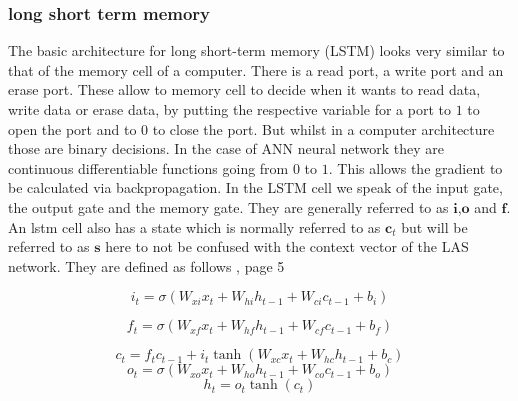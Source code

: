 \documentclass[a4paper]{article}
\begin{document}
\subsubsection{long short term memory}
The basic architecture for long short-term memory (LSTM) looks very similar to that of the memory cell of a computer. There is a read port, a write port and an erase port. These allow to memory cell to decide when it wants to read data, write data or erase data, by putting the respective variable for a port to $1$ to open the port and to $0$ to close the port. But whilst in a computer architecture those are binary decisions. In the case of ANN neural network they are continuous differentiable functions going from $0$ to $1$. This allows the gradient to be calculated via backpropagation. 
In the LSTM cell we speak of the input gate, the output gate and the memory gate. They are generally referred to as $\bm{i}$,$\bm{o}$ and 
$\bm{f}$. An lstm cell also has a state which is normally referred to as $\bm{c}_t$ but will be referred to as $\bm{s}$ here to not be confused with the context vector of the LAS network. They are defined as follows \cite{RNN}, page 5

\begin{equation}
i_t = \sigma(W_{xi}x_t + W_{hi}h_{t-1} + W_{ci}c_{t-1} + b_i)
\end{equation}

\begin{equation}
f_t = \sigma(W_{xf}x_t + W_{hf}h_{t-1} + W_{cf}c_{t-1} + b_f)
\end{equation}

\begin{equation}
c_t = f_tc_{t-1} + i_t\tanh(W_{xc}x_t + W_{hc}h_{t-1} + b_c)
\end{equation}
\begin{equation}
o_t = \sigma(W_{xo}x_t + W_{ho}h_{t-1} + W_{co}c_{t-1} + b_o)
\end{equation}
\begin{equation}
h_t = o_t \tanh(c_t)
\end{equation}
\end{document}
